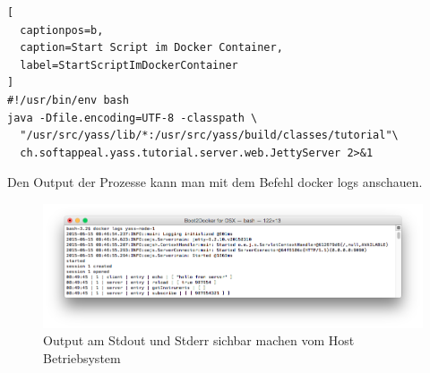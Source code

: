 \begin{lstlisting}[
  captionpos=b,
  caption=Start Script im Docker Container,
  label=StartScriptImDockerContainer
]
#!/usr/bin/env bash
java -Dfile.encoding=UTF-8 -classpath \
  "/usr/src/yass/lib/*:/usr/src/yass/build/classes/tutorial"\
  ch.softappeal.yass.tutorial.server.web.JettyServer 2>&1
\end{lstlisting}

Den Output der Prozesse kann man mit dem Befehl docker logs anschauen.

\begin{figure}[htbp]
  \begin{center}
    \includegraphics[width=1.0\textwidth]{./images/logOutput.png}
    \caption{Output am Stdout und Stderr sichbar machen vom Host Betriebsystem}
    \label{img:logOutput}
  \end{center}
\end{figure}





